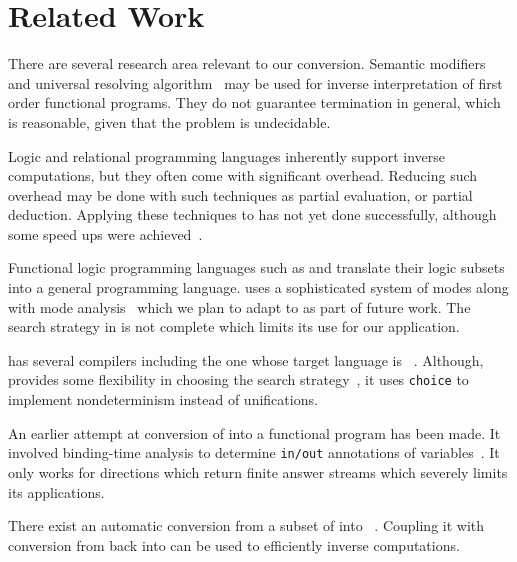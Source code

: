 \section{Related Work}

There are several research area relevant to our conversion.
Semantic modifiers~\cite{abramov2001standard} and universal resolving algorithm~\cite{abramov2002principles} may be used for inverse interpretation of first order functional programs.
They do not guarantee termination in general, which is reasonable, given that the problem is undecidable.

Logic and relational programming languages inherently support inverse computations, but they often come with significant overhead.
Reducing such overhead may be done with such techniques as partial evaluation, or partial deduction.
Applying these techniques to \mk has not yet done successfully, although some speed ups were achieved~\cite{EPTCS341.5}.

Functional logic programming languages such as \curry and \mercury translate their logic subsets into a general programming language.
\mercury uses a sophisticated system of modes along with mode analysis~\cite{overton2002constraint} which we plan to adapt to \mk as part of future work.
The search strategy in \mercury is not complete which limits its use for our application.

\curry has several compilers including the one whose target language is \haskell~\cite{brassel2011kics2}.
Although, \curry provides some flexibility in choosing the search strategy~\cite{hanus2012search}, it uses \lstinline{choice} to implement nondeterminism instead of unifications.

An earlier attempt at conversion of \mk into a functional program has been made.
It involved binding-time analysis to determine \lstinline{in/out} annotations of variables~\cite{verbitskaiabinding}.
It only works for directions which return finite answer streams which severely limits its applications.

There exist an automatic conversion from a subset of \ocaml into \ocanren~\cite{lozov2017typed}.
Coupling it with conversion from \mk back into \ocaml can be used to efficiently inverse computations.



